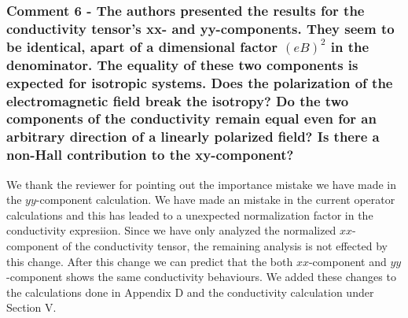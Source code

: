 \documentclass{article}
\begin{document}
\subsubsection*{Comment 6 -
\color{RoyalBlue} The authors presented the results for the conductivity tensor's xx- and yy-components. They seem to be identical, apart of a dimensional factor $(eB)^2$ in the denominator. The equality of these two components is expected for isotropic systems. Does the polarization of the electromagnetic field break the isotropy? Do the two components of the conductivity remain equal even for an arbitrary direction of a linearly polarized field? Is there a non-Hall contribution to the xy-component?
}

We thank the reviewer for pointing out the importance mistake we have made in the $yy$-component calculation. We have made an mistake in the current operator calculations and this has leaded to a unexpected normalization factor in the conductivity expresiion. Since we have only analyzed the normalized $xx$-component of the conductivity tensor, the remaining analysis is not effected by this change. After this change we can predict that the both $xx$-component and $yy$-component shows the same conductivity behaviours. We added these changes to the calculations done in Appendix D and the conductivity calculation under Section V.
\end{document}
